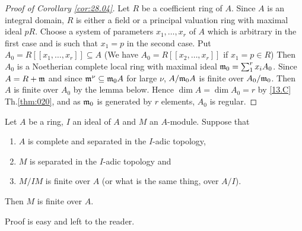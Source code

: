 \documentclass[../main]{subfiles}
\begin{document}
\begin{proof}[Proof of Corollary \ref{cor:28.04}] Let $R$ be a coefficient ring of $A$. Since $A$ is an integral domain, $R$ is either a field or a principal valuation ring with maximal ideal $pR$. Choose a system of parameters $x_1, \ldots, x_r$ of $A$ which is arbitrary in the first case and is such that $x_1=p$ in the second case. Put $A_0=R[[x_1, \ldots,x_r]] \subseteq A$ (We have $A_0=R[[x_2, \ldots, x_r]]$ if $x_1=p \in R$) Then $A_0$ is a Noetherian complete local ring with maximal ideal $\mathfrak{m}_0=\sum_1^r x_i A_0$. Since $A=R+\mathfrak{m}$ and since $\mathfrak{m}^\nu \subseteq \mathfrak{m}_0 A$ for large $\nu$, $A/\mathfrak{m}_0A$ is finite over $A_0 / \mathfrak{m}_0$. Then $A$ is finite over $A_0$ by the lemma below. Hence $\dim A=\dim A_0=r$ by \ref{13.C} Th.\ref{thm:020}, and as $\mathfrak{m}_0$ is generated by $r$ elements, $A_0$ is regular.
\end{proof}

\begin{lemma}\label{lem:28.02}
Let $A$ be a ring, $I$ an ideal of $A$ and $M$ an $A$-module. Suppose that 
\begin{enumerate}[label = (\alph*)]
    \item $A$ is complete and separated in the $I$-adic topology,
    \item $M$ is separated in the $I$-adic topology and
    \item $M/IM$ is finite over $A$ (or what is the same thing, over $A/I$).
\end{enumerate}
 Then $M$ is finite over $A$.
\end{lemma} 

Proof is easy and left to the reader.
\end{document}

